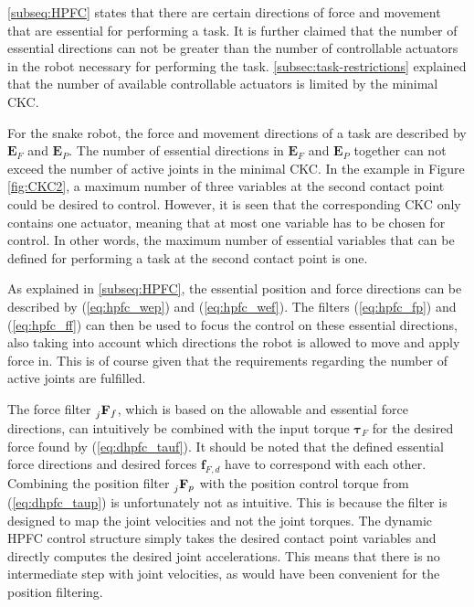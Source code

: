 \ref{subseq:HPFC} states that there are certain directions of force and movement that are essential for performing a task. It is further claimed that the number of essential directions can not be greater than the number of controllable actuators in the robot necessary for performing the task. \ref{subsec:task-restrictions} explained that the number of available controllable actuators is limited by the minimal CKC.

For the snake robot, the force and movement directions of a task are described by $\mathbf{E}_F$ and $\mathbf{E}_P$.
The number of essential directions in $\mathbf{E}_F$ and $\mathbf{E}_P$ together can not exceed the number of active joints in the minimal CKC. In the example in Figure \ref{fig:CKC2}, a maximum number of three variables at the second contact point could be desired to control. However, it is seen that the corresponding CKC only contains one actuator, meaning that at most one variable has to be chosen for control. In other words, the maximum number of essential variables that can be defined for performing a task at the second contact point is one.

As explained in \ref{subseq:HPFC}, the essential position and force directions can be described by (\ref{eq:hpfc_wep}) and (\ref{eq:hpfc_wef}). The filters (\ref{eq:hpfc_fp}) and (\ref{eq:hpfc_ff}) can then be used to focus the control on these essential directions, also taking into account which directions the robot is allowed to move and apply force in. This is of course given that the requirements regarding the number of active joints are fulfilled.

The force filter $\prescript{}{j}{\mathbf{F}}_{f}$, which is based on the allowable and essential force directions, can intuitively be combined with the input torque $\boldsymbol{\tau}_F$ for the desired force found by (\ref{eq:dhpfc_tauf}). It should be noted that the defined essential force directions and desired forces $\mathbf{f}_{F,d}$ have to correspond with each other. Combining the position filter $\prescript{}{j}{\mathbf{F}}_{p}$ with the position control torque from (\ref{eq:dhpfc_taup}) is unfortunately not as intuitive. This is because the filter is designed to map the joint velocities and not the joint torques. The dynamic HPFC control structure simply takes the desired contact point variables and directly computes the desired joint accelerations. This means that there is no intermediate step with joint velocities, as would have been convenient for the position filtering.

